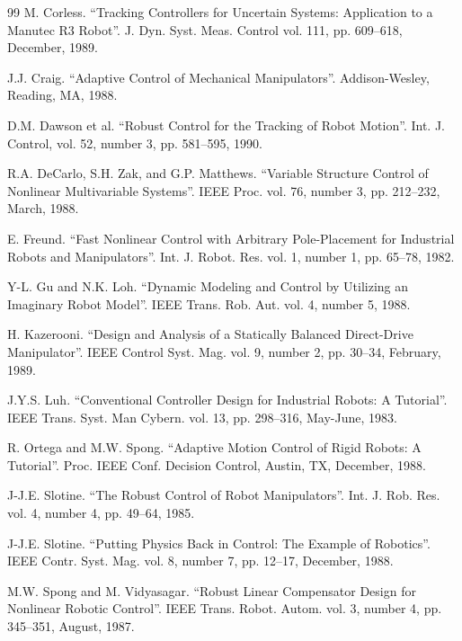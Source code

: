 \documentclass[UTF8,12pt,a4paper]{ctexart}
\begin{document}
\begin{thebibliography}{99}
M. Corless.
``Tracking Controllers for Uncertain Systems: Application to a Manutec R3 Robot''. J. Dyn. Syst. Meas. Control vol. 111, pp. 609--618, December, 1989.

J.J. Craig.
``Adaptive Control of Mechanical Manipulators''. Addison-Wesley, Reading, MA, 1988.

D.M. Dawson et al.
``Robust Control for the Tracking of Robot Motion''. Int. J. Control, vol. 52, number 3, pp. 581--595, 1990.

R.A. DeCarlo, S.H. Zak, and G.P. Matthews.
``Variable Structure Control of Nonlinear Multivariable Systems''. IEEE Proc. vol. 76, number 3, pp. 212--232, March, 1988.

E. Freund.
``Fast Nonlinear Control with Arbitrary Pole-Placement for Industrial Robots and Manipulators''. Int. J. Robot. Res. vol. 1, number 1, pp. 65--78, 1982.

Y-L. Gu and N.K. Loh.
``Dynamic Modeling and Control by Utilizing an Imaginary Robot Model''. IEEE Trans. Rob. Aut. vol. 4, number 5, 1988.

H. Kazerooni.
``Design and Analysis of a Statically Balanced Direct-Drive Manipulator''. IEEE Control Syst. Mag. vol. 9, number 2, pp. 30--34, February, 1989.

J.Y.S. Luh.
``Conventional Controller Design for Industrial Robots: A Tutorial''. IEEE Trans. Syst. Man Cybern. vol. 13, pp. 298--316, May-June, 1983.

R. Ortega and M.W. Spong.
``Adaptive Motion Control of Rigid Robots: A Tutorial''. Proc. IEEE Conf. Decision Control, Austin, TX, December, 1988.

J-J.E. Slotine.
``The Robust Control of Robot Manipulators''. Int. J. Rob. Res. vol. 4, number 4, pp. 49--64, 1985.

J-J.E. Slotine.
``Putting Physics Back in Control: The Example of Robotics''. IEEE Contr. Syst. Mag. vol. 8, number 7, pp. 12--17, December, 1988.

M.W. Spong and M. Vidyasagar.
``Robust Linear Compensator Design for Nonlinear Robotic Control''. IEEE Trans. Robot. Autom. vol. 3, number 4, pp. 345--351, August, 1987.


\end{thebibliography}
\end{document}

